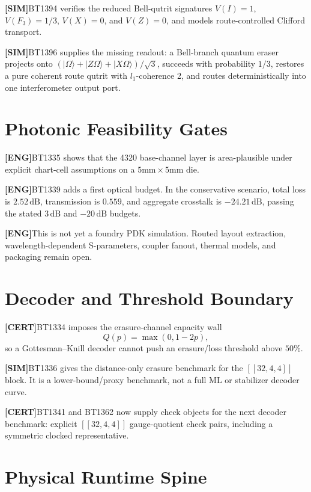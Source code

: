 \documentclass[11pt]{article}
\newcommand{\claim}[2]{\noindent\textbf{[#1]}\;#2}
\begin{document}
\claim{SIM}{BT1394 verifies the reduced Bell-qutrit signatures \(V(I)=1\), \(V(F_3)=1/3\), \(V(X)=0\), and \(V(Z)=0\), and models route-controlled Clifford transport.}

\claim{SIM}{BT1396 supplies the missing readout: a Bell-branch quantum eraser projects onto \((|\Omega\rangle+|Z\Omega\rangle+|X\Omega\rangle)/\sqrt 3\), succeeds with probability \(1/3\), restores a pure coherent route qutrit with \(l_1\)-coherence 2, and routes deterministically into one interferometer output port.}

\section{Photonic Feasibility Gates}

\claim{ENG}{BT1335 shows that the 4320 base-channel layer is area-plausible under explicit chart-cell assumptions on a \(5\mathrm{mm}\times5\mathrm{mm}\) die.}

\claim{ENG}{BT1339 adds a first optical budget. In the conservative scenario, total loss is \(2.52\,\mathrm{dB}\), transmission is \(0.559\), and aggregate crosstalk is \(-24.21\,\mathrm{dB}\), passing the stated \(3\,\mathrm{dB}\) and \(-20\,\mathrm{dB}\) budgets.}

\claim{ENG}{This is not yet a foundry PDK simulation. Routed layout extraction, wavelength-dependent S-parameters, coupler fanout, thermal models, and packaging remain open.}

\section{Decoder and Threshold Boundary}

\claim{CERT}{BT1334 imposes the erasure-channel capacity wall}
\[
Q(p)=\max(0,1-2p),
\]
so a Gottesman--Knill decoder cannot push an erasure/loss threshold above \(50\%\).

\claim{SIM}{BT1336 gives the distance-only erasure benchmark for the \([[32,4,4]]\) block. It is a lower-bound/proxy benchmark, not a full ML or stabilizer decoder curve.}

\claim{CERT}{BT1341 and BT1362 now supply check objects for the next decoder benchmark: explicit \([[32,4,4]]\) gauge-quotient check pairs, including a symmetric clocked representative.}

\section{Physical Runtime Spine}
\end{document}
